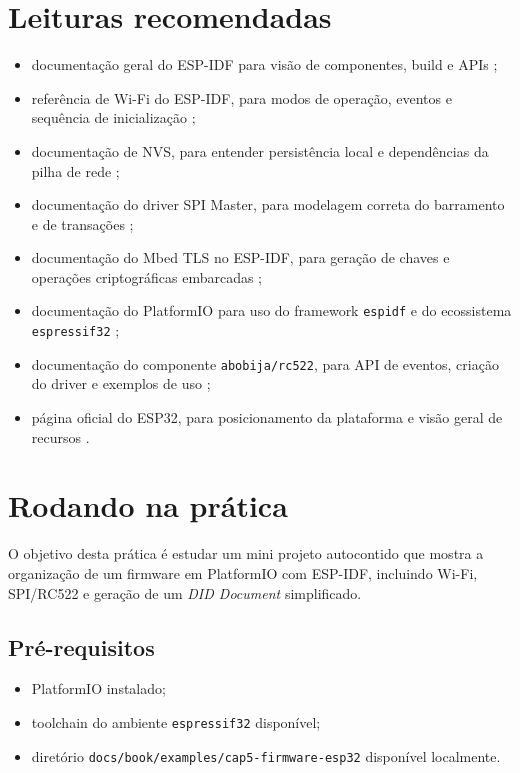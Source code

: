 \section{Leituras recomendadas}
\begin{itemize}[leftmargin=*]
  \item documentação geral do ESP-IDF para visão de componentes, build e APIs \citep{espidf_programming_guide};
  \item referência de Wi-Fi do ESP-IDF, para modos de operação, eventos e sequência de inicialização \citep{espidf_wifi};
  \item documentação de NVS, para entender persistência local e dependências da pilha de rede \citep{espidf_nvs};
  \item documentação do driver SPI Master, para modelagem correta do barramento e de transações \citep{espidf_spi_master};
  \item documentação do Mbed TLS no ESP-IDF, para geração de chaves e operações criptográficas embarcadas \citep{espidf_mbedtls};
  \item documentação do PlatformIO para uso do framework \texttt{espidf} e do ecossistema \texttt{espressif32} \citep{platformio_espidf,platformio_espressif32};
  \item documentação do componente \texttt{abobija/rc522}, para API de eventos, criação do driver e exemplos de uso \citep{abobija_rc522};
  \item página oficial do ESP32, para posicionamento da plataforma e visão geral de recursos \citep{espressif_esp32_overview}.
\end{itemize}

\section{Rodando na prática}
O objetivo desta prática é estudar um mini projeto autocontido que mostra a organização de um firmware em PlatformIO com ESP-IDF, incluindo Wi-Fi, SPI/RC522 e geração de um \textit{DID Document} simplificado.

\subsection{Pré-requisitos}
\begin{itemize}[leftmargin=*]
  \item PlatformIO instalado;
  \item toolchain do ambiente \texttt{espressif32} disponível;
  \item diretório \texttt{docs/book/examples/cap5-firmware-esp32} disponível localmente.
\end{itemize}

